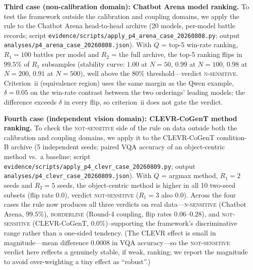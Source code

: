 \documentclass[11pt]{article}
\begin{document}
\noindent\textbf{Third case (non-calibration domain): Chatbot Arena model ranking.} To test the framework outside the calibration and coupling domains, we apply the rule to the Chatbot Arena head-to-head archive (20 models, per-model battle records; script \texttt{evidence/scripts/apply\_p4\_arena\_case\_20260808.py}; output \texttt{analyses/p4\_arena\_case\_20260808.json}). With $Q$ = top-5 win-rate ranking, $R_1{=}100$ battles per model and $R_2$ = the full archive, the top-5 ranking flips in $99.5\%$ of $R_1$ subsamples (stability curve: $1.00$ at $N{=}50$, $0.99$ at $N{=}100$, $0.98$ at $N{=}200$, $0.91$ at $N{=}500$), well above the $80\%$ threshold---verdict \textsc{n-sensitive}. Criterion~ii (equivalence region) uses the same margin as the Qwen example, $\delta{=}0.05$ on the win-rate contrast between the two orderings' leading models; the difference exceeds $\delta$ in every flip, so criterion~ii does not gate the verdict.

\noindent\textbf{Fourth case (independent vision domain): CLEVR-CoGenT method ranking.} To check the \textsc{not-sensitive} side of the rule on data outside both the calibration and coupling domains, we apply it to the CLEVR-CoGenT condition-B archive (5 independent seeds; paired VQA accuracy of an object-centric method vs.\ a baseline; script \texttt{evidence/scripts/apply\_p4\_clevr\_case\_20260809.py}; output \texttt{analyses/p4\_clevr\_case\_20260809.json}). With $Q$ = argmax method, $R_1{=}2$ seeds and $R_2{=}5$ seeds, the object-centric method is higher in all 10 two-seed subsets (flip rate $0.0$), verdict \textsc{not-sensitive} ($R_1{=}3$ also $0.0$). Across the four cases the rule now produces all three verdicts on real data---\textsc{n-sensitive} (Chatbot Arena, $99.5\%$), \textsc{borderline} (Round-4 coupling, flip rates $0.06$--$0.28$), and \textsc{not-sensitive} (CLEVR-CoGenT, $0.0\%$)--supporting the framework's discriminative range rather than a one-sided tendency. (The CLEVR effect is small in magnitude---mean difference $0.0008$ in VQA accuracy---so the \textsc{not-sensitive} verdict here reflects a genuinely stable, if weak, ranking; we report the magnitude to avoid over-weighting a tiny effect as ``robust''.)
\end{document}
